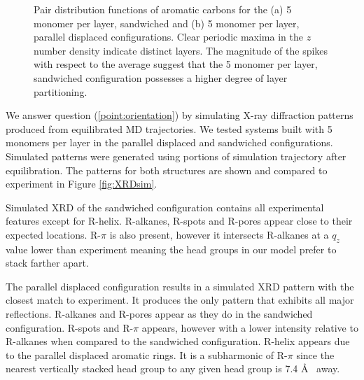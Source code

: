 \documentclass{article}
\begin{document}
\begin{figure}
\begin{subfigure}{0.45\textwidth}
                \caption{}\label{fig:zdf_offset}
        \end{subfigure}
        \caption{Pair distribution functions of aromatic carbons for the
        (a) 5 monomer per layer, sandwiched and (b) 5 monomer per layer,
        parallel displaced configurations. Clear periodic maxima in the
        $z$ number density indicate distinct layers. The magnitude
        of the spikes with respect to the average suggest that the 5
        monomer per layer, sandwiched configuration possesses a higher
        degree of layer partitioning.}\label{fig:zdf}
  \end{figure}

  We answer question (\ref{point:orientation}) by simulating X-ray diffraction
  patterns produced from equilibrated MD trajectories. We tested systems built
  with 5 monomers per layer in the parallel displaced and sandwiched
  configurations. Simulated patterns were generated using portions of simulation
  trajectory after equilibration. The patterns for both structures are shown and
  compared to experiment in Figure \ref{fig:XRDsim}.

  Simulated XRD of the sandwiched configuration contains all experimental
  features except for R-helix. R-alkanes, R-spots and R-pores appear close to their
  expected locations. R-$\pi$ is also present, however it intersects R-alkanes at
  a $q_z$ value lower than experiment meaning the head groups in our model prefer 
  to stack farther apart. 

  The parallel displaced configuration results in a simulated XRD pattern with
  the closest match to experiment. It produces the only pattern that exhibits all
  major reflections. R-alkanes and R-pores appear as they do in the
  sandwiched configuration. R-spots and R-$\pi$ appears, however with a lower intensity relative to
  R-alkanes when compared to the sandwiched configuration. R-helix appears due to
  the parallel displaced aromatic rings. It is a subharmonic of R-$\pi$ since the
  nearest vertically stacked head group to any given head group is 7.4 \AA~ away. 
\end{document}

